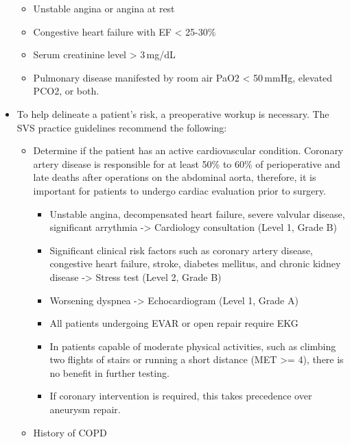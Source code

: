 \documentclass[
]{book}
\begin{document}
\begin{itemize}
  \begin{itemize}
  \item
    Unstable angina or angina at rest
  \item
    Congestive heart failure with EF \textless{} 25-30\%
  \item
    Serum creatinine level \textgreater{} 3\,mg/dL
  \item
    Pulmonary disease manifested by room air PaO2 \textless{} 50\,mmHg,
    elevated PCO2, or both.
  \end{itemize}
\item
  To help delineate a patient's risk, a preoperative workup is
  necessary. The SVS practice guidelines recommend the following:
  \citep{chaikofSocietyVascularSurgery2018a}

  \begin{itemize}
  \item
    Determine if the patient has an active cardiovascular condition.
    Coronary artery disease is responsible for at least 50\% to 60\%
    of perioperative and late deaths after operations on the
    abdominal aorta, therefore, it is important for patients to
    undergo cardiac evaluation prior to surgery.

    \begin{itemize}
    \item
      Unstable angina, decompensated heart failure, severe
      valvular disease, significant arrythmia -\textgreater{} Cardiology
      consultation (Level 1, Grade B)
    \item
      Significant clinical risk factors such as coronary artery
      disease, congestive heart failure, stroke, diabetes
      mellitus, and chronic kidney disease -\textgreater{} Stress test (Level
      2, Grade B)
    \item
      Worsening dyspnea -\textgreater{} Echocardiogram (Level 1, Grade A)
    \item
      All patients undergoing EVAR or open repair require EKG
    \item
      In patients capable of moderate physical activities, such as
      climbing two flights of stairs or running a short distance
      (MET \textgreater= 4), there is no benefit in further testing.
    \item
      If coronary intervention is required, this takes precedence
      over aneurysm repair.
    \end{itemize}
  \item
    History of COPD


\end{itemize}
\end{itemize}
\end{document}
